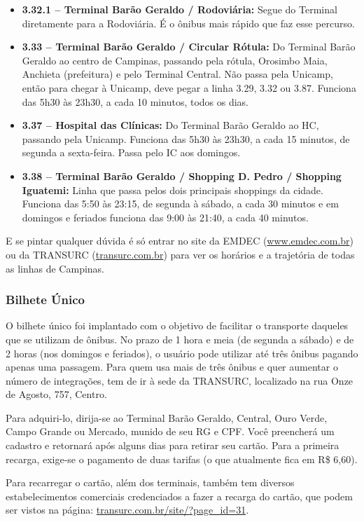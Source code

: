 \begin{itemize}
\item  \textbf{3.32.1 -- Terminal Barão Geraldo / Rodoviária:} Segue do Terminal
       diretamente para a Rodoviária. É o ônibus mais rápido que faz esse percurso.

\item  \textbf{3.33 -- Terminal Barão Geraldo / Circular Rótula:} Do Terminal
       Barão Geraldo ao centro de Campinas, passando pela rótula, Orosimbo Maia,
       Anchieta (prefeitura) e pelo Terminal Central. Não passa pela Unicamp, então
       para chegar à Unicamp, deve pegar a linha 3.29, 3.32 ou 3.87. Funciona das
       5h30 às 23h30, a cada 10 minutos, todos os dias.

\item  \textbf{3.37 -- Hospital das Clínicas:} Do Terminal Barão Geraldo ao HC,
       passando pela Unicamp. Funciona das 5h30 às 23h30, a cada 15 minutos, de
       segunda a sexta-feira. Passa pelo IC aos domingos.

\item  \textbf{3.38 -- Terminal Barão Geraldo / Shopping D. Pedro / Shopping
        Iguatemi:} Linha que passa pelos dois principais shoppings da cidade.
       Funciona das 5:50 às 23:15, de segunda à sábado, a cada 30 minutos e em
       domingos e feriados funciona das 9:00 às 21:40, a cada 40 minutos.
\end{itemize}

E se pintar qualquer dúvida é só entrar no site da EMDEC
(\url{www.emdec.com.br}) ou da TRANSURC (\url{transurc.com.br}) para ver os
horários e a trajetória de todas as linhas de Campinas.

\subsubsection{Bilhete Único}

O bilhete único foi implantado com o objetivo de facilitar o transporte daqueles
que se utilizam de ônibus. No prazo de 1 hora e meia (de segunda a sábado) e de
2 horas (nos domingos e feriados), o usuário pode utilizar até três ônibus
pagando apenas uma passagem. Para quem usa mais de três ônibus e quer aumentar
o número de integrações, tem de ir à sede da TRANSURC, localizado na rua Onze de
Agosto, 757, Centro.

Para adquiri-lo, dirija-se ao Terminal Barão Geraldo, Central, Ouro Verde, Campo
Grande ou Mercado, munido de seu RG e CPF. Você preencherá um cadastro
e retornará após alguns dias para retirar seu cartão. Para a primeira recarga,
exige-se o pagamento de duas tarifas (o que atualmente fica em R\$ 6,60).

Para recarregar o cartão, além dos terminais, também tem diversos
estabelecimentos comerciais credenciados a fazer a recarga do cartão, que podem
ser vistos na página: \url{transurc.com.br/site/?page_id=31}.
